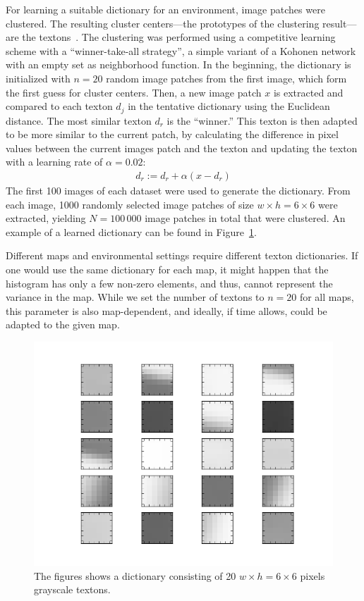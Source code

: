 \documentclass{report}
\begin{document}
For learning a suitable dictionary for an environment, image patches
were clustered. The resulting cluster centers---the prototypes of the
clustering result---are the textons~\cite{varma2003texture}. The
clustering was performed using a competitive learning scheme with a
``winner-take-all strategy'', a simple variant of a Kohonen
network~\cite{kohonen1990self} with an empty set as neighborhood
function. In the beginning, the dictionary is initialized with
$n = 20$ random image patches from the first image, which form the
first guess for cluster centers. Then, a new image patch $x$ is
extracted and compared to each texton $d_j$ in the tentative
dictionary using the Euclidean distance. The most similar texton $d_r$
is the ``winner.'' This texton is then adapted to be more similar to
the current patch, by calculating the difference in pixel values
between the current images patch and the texton and updating the
texton with a learning rate of $\alpha = 0.02$:
\begin{align}
  d_r := d_r + \alpha (x - d_r)
\end{align}
The first 100 images of each dataset were used to generate the
dictionary. From each image, 1000 randomly selected image patches of
size $w \times h = 6 \times 6$ were extracted, yielding $N = 100\,000$
image patches in total that were clustered. An example of a learned
dictionary can be found in Figure~\ref{fig:dictionary}.

Different maps and environmental settings require different texton
dictionaries. If one would use the same dictionary for each map, it
might happen that the histogram has only a few non-zero elements, and
thus, cannot represent the variance in the map. While we set the
number of textons to $n = 20$ for all maps, this parameter is also
map-dependent, and ideally, if time allows, could be adapted to the
given map.

\begin{figure}[h!]
\begin{center}
\includegraphics[width=0.7\columnwidth]{dict}
\caption{{\label{fig:dictionary} The figures shows a dictionary
    consisting of 20 $w \times h = 6 \times 6$ pixels grayscale
    textons.}}
\end{center}
\end{figure}
\end{document}
